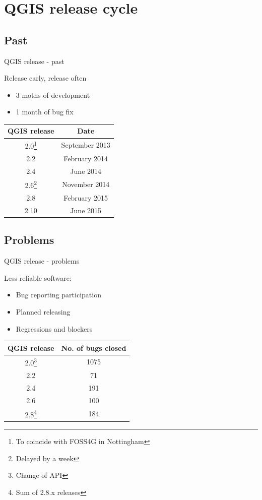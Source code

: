 \section{QGIS release cycle}
\subsection{Past}
\begin{frame}{QGIS release - past}
	\begin{block}{Release early, release often}
		\begin{itemize}
			\item 3 moths of development
			\item 1 month of bug fix
		\end{itemize}
	\end{block}
	\begin{center}

	\begin{tabular}{|c|c|}
		\hline QGIS release & Date \\ 
		\hline 2.0\footnote{To coincide with FOSS4G in Nottingham} & September 2013 \\ 
		\hline 2.2 & February 2014 \\ 
		\hline 2.4 & June 2014 \\ 
		\hline 2.6\footnote{Delayed by a week} & November 2014 \\ 
		\hline 2.8 & February 2015 \\ 
		\hline 2.10 & June 2015 \\ 
		\hline 
	\end{tabular} 
	\end{center} 
\end{frame}


\subsection{Problems}
\begin{frame}{QGIS release - problems}
	\begin{block}{Less reliable software:}
		\begin{itemize}
			\item Bug reporting participation
			\item Planned releasing 
			\item Regressions and blockers
		\end{itemize}
	\end{block}
	\begin{center}
		
		\begin{tabular}{|c|c|}
			\hline QGIS release & No. of bugs closed \\ 
			\hline 2.0\footnote{Change of API} & 1075 \\ 
			\hline 2.2 & 71 \\ 
			\hline 2.4 & 191 \\ 
			\hline 2.6 & 100 \\ 
			\hline 2.8\footnote{Sum of 2.8.x releases} & 184 \\ 
			\hline 
		\end{tabular}
	\end{center} 
\end{frame}

